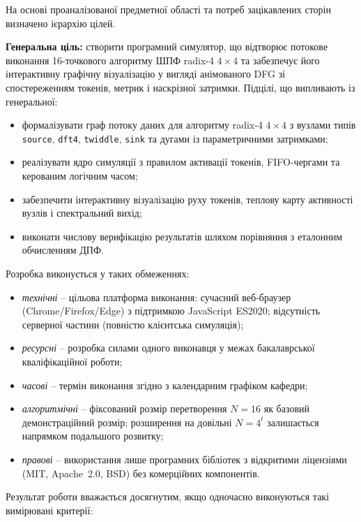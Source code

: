 \documentclass[
]{article}
\begin{document}
На основі проаналізованої предметної області та потреб зацікавлених
сторін визначено ієрархію цілей.

\textbf{Генеральна ціль:} створити програмний симулятор, що відтворює
потокове виконання 16-точкового алгоритму ШПФ radix-4 \(4 \times 4\) та
забезпечує його інтерактивну графічну візуалізацію у вигляді анімованого
DFG зі спостереженням токенів, метрик і наскрізної затримки. Підцілі, що
випливають із генеральної:

\begin{itemize}
\item
  формалізувати граф потоку даних для алгоритму radix-4 \(4 \times 4\) з
  вузлами типів \texttt{source}, \texttt{dft4}, \texttt{twiddle},
  \texttt{sink} та дугами із параметричними затримками;
\item
  реалізувати ядро симуляції з правилом активації токенів, FIFO-чергами
  та керованим логічним часом;
\item
  забезпечити інтерактивну візуалізацію руху токенів, теплову карту
  активності вузлів і спектральний вихід;
\item
  виконати числову верифікацію результатів шляхом порівняння з еталонним
  обчисленням ДПФ.
\end{itemize}

Розробка виконується у таких обмеженнях:

\begin{itemize}
\item
  \emph{технічні} -- цільова платформа виконання: сучасний веб-браузер
  (Chrome/Firefox/Edge) з підтримкою JavaScript ES2020; відсутність
  серверної частини (повністю клієнтська симуляція);
\item
  \emph{ресурсні} -- розробка силами одного виконавця у межах
  бакалаврської кваліфікаційної роботи;
\item
  \emph{часові} -- термін виконання згідно з календарним графіком
  кафедри;
\item
  \emph{алгоритмічні} -- фіксований розмір перетворення \(N = 16\) як
  базовий демонстраційний розмір; розширення на довільні \(N = 4^{t}\)
  залишається напрямком подальшого розвитку;
\item
  \emph{правові} -- використання лише програмних бібліотек з відкритими
  ліцензіями (MIT, Apache~2.0, BSD) без комерційних компонентів.
\end{itemize}

Результат роботи вважається досягнутим, якщо одночасно виконуються такі
вимірювані критерії:
\end{document}
